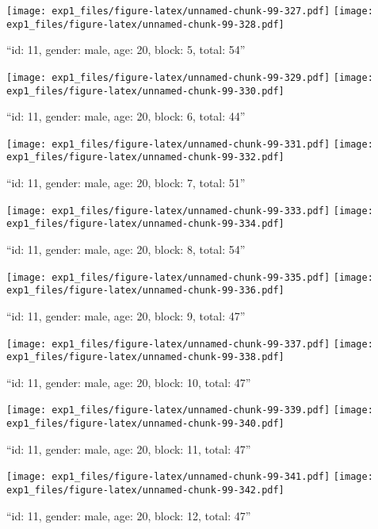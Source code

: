 \documentclass[,]{article}
\begin{document}
\texttt{[image: exp1\_files/figure-latex/unnamed-chunk-99-327.pdf]}
\texttt{[image: exp1\_files/figure-latex/unnamed-chunk-99-328.pdf]}

\newpage
[1] 

``id: 11, gender: male, age: 20, block: 5, total: 54''

\texttt{[image: exp1\_files/figure-latex/unnamed-chunk-99-329.pdf]}
\texttt{[image: exp1\_files/figure-latex/unnamed-chunk-99-330.pdf]}

\newpage
[1] 

``id: 11, gender: male, age: 20, block: 6, total: 44''

\texttt{[image: exp1\_files/figure-latex/unnamed-chunk-99-331.pdf]}
\texttt{[image: exp1\_files/figure-latex/unnamed-chunk-99-332.pdf]}

\newpage
[1] 

``id: 11, gender: male, age: 20, block: 7, total: 51''

\texttt{[image: exp1\_files/figure-latex/unnamed-chunk-99-333.pdf]}
\texttt{[image: exp1\_files/figure-latex/unnamed-chunk-99-334.pdf]}

\newpage
[1] 

``id: 11, gender: male, age: 20, block: 8, total: 54''

\texttt{[image: exp1\_files/figure-latex/unnamed-chunk-99-335.pdf]}
\texttt{[image: exp1\_files/figure-latex/unnamed-chunk-99-336.pdf]}

\newpage
[1] 

``id: 11, gender: male, age: 20, block: 9, total: 47''

\texttt{[image: exp1\_files/figure-latex/unnamed-chunk-99-337.pdf]}
\texttt{[image: exp1\_files/figure-latex/unnamed-chunk-99-338.pdf]}

\newpage
[1] 

``id: 11, gender: male, age: 20, block: 10, total: 47''

\texttt{[image: exp1\_files/figure-latex/unnamed-chunk-99-339.pdf]}
\texttt{[image: exp1\_files/figure-latex/unnamed-chunk-99-340.pdf]}

\newpage
[1] 

``id: 11, gender: male, age: 20, block: 11, total: 47''

\texttt{[image: exp1\_files/figure-latex/unnamed-chunk-99-341.pdf]}
\texttt{[image: exp1\_files/figure-latex/unnamed-chunk-99-342.pdf]}

\newpage
[1] 

``id: 11, gender: male, age: 20, block: 12, total: 47''
\end{document}
